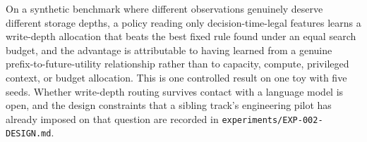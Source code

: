 \documentclass[11pt]{article}
\begin{document}
On a synthetic benchmark where different observations genuinely deserve
different storage depths, a policy reading only decision-time-legal features
learns a write-depth allocation that beats the best fixed rule found under an
equal search budget, and the advantage is attributable to having learned from a
genuine prefix-to-future-utility relationship rather than to capacity, compute,
privileged context, or budget allocation. This is one controlled result on one
toy with five seeds. Whether write-depth routing survives contact with a
language model is open, and the design constraints that a sibling track's
engineering pilot has already imposed on that question are recorded in
\texttt{experiments/EXP-002-DESIGN.md}.



\end{document}
